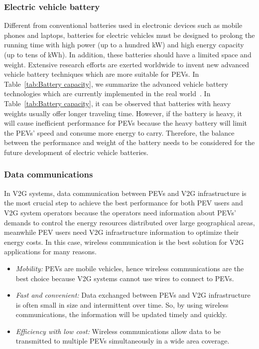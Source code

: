 \documentclass[twocolumn,10pt]{IEEEtran}
\begin{document}
\subsubsection{Electric vehicle battery}

Different from conventional batteries used in electronic devices such as mobile phones and laptops, batteries for electric vehicles must be designed to prolong the running time with high power (up to a hundred kW) and high energy capacity (up to tens of kWh). In addition, these batteries should have a limited space and weight.  Extensive research efforts are exerted worldwide to invent new advanced vehicle battery techniques which are more suitable for PEVs. In Table~\ref{tab:Battery capacity}, we summarize the advanced vehicle battery technologies which are currently implemented in the real world~\cite{Battery_Type}. In Table~\ref{tab:Battery capacity}, it can be observed that batteries with heavy weights usually offer longer traveling time. However, if the battery is heavy, it will cause inefficient performance for PEVs because the heavy battery will limit the PEVs' speed and consume more energy to carry. Therefore, the balance between the performance and weight of the battery needs to be considered for the future development of electric vehicle batteries. 


\subsubsection{Data communications}

In V2G systems, data communication between PEVs and V2G infrastructure is the most crucial step to achieve the best performance for both PEV users and V2G system operators because the operators need information about PEVs' demands to control the energy resources distributed over large geographical areas, meanwhile PEV users need V2G infrastructure information to optimize their energy costs. In this case, wireless communication is the best solution for V2G applications for many reasons. 
\begin{itemize}
\item \emph{Mobility:} PEVs are mobile vehicles, hence wireless communications are the best choice because V2G systems cannot use wires to connect to PEVs. 
\item \emph{Fast and convenient:} Data exchanged between PEVs and V2G infrastructure is often small in size and intermittent over time. So, by using wireless communications, the information will be updated timely and quickly. 
\item \emph{Efficiency with low cost:} Wireless communications allow data to be transmitted to multiple PEVs simultaneously in a wide area coverage. 
\end{itemize}
\end{document}

